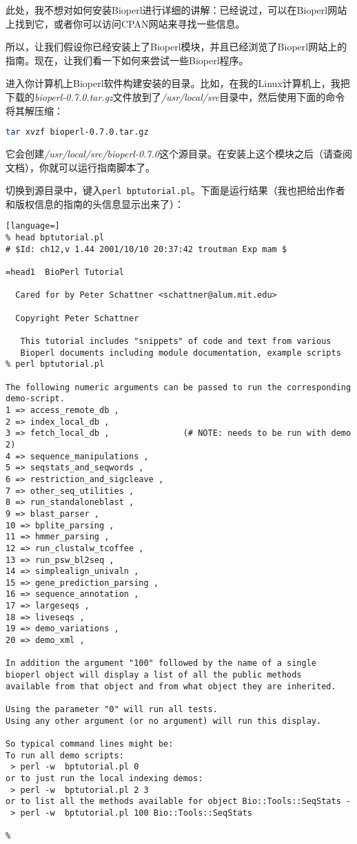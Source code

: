 此处，我不想对如何安装Bioperl进行详细的讲解：已经说过，可以在Bioperl网站上找到它，或者你可以访问CPAN网站来寻找一些信息。

所以，让我们假设你已经安装上了Bioperl模块，并且已经浏览了Bioperl网站上的指南。现在，让我们看一下如何来尝试一些Bioperl程序。

进入你计算机上Bioperl软件构建安装的目录。比如，在我的Linux计算机上，我把下载的\textit{bioperl-0.7.0.tar.gz}文件放到了\textit{/usr/local/src}目录中，然后使用下面的命令将其解压缩：

\begin{lstlisting}[language=bash]
tar xvzf bioperl-0.7.0.tar.gz
\end{lstlisting}

它会创建\textit{/usr/local/src/bioperl-0.7.0}这个源目录。在安装上这个模块之后（请查阅文档），你就可以运行指南脚本了。

切换到源目录中，键入\verb|perl bptutorial.pl|。下面是运行结果（我也把给出作者和版权信息的指南的头信息显示出来了）：

\begin{lstlisting}[language=]
% head bptutorial.pl 
# $Id: ch12,v 1.44 2001/10/10 20:37:42 troutman Exp mam $

=head1  BioPerl Tutorial

  Cared for by Peter Schattner <schattner@alum.mit.edu>

  Copyright Peter Schattner

   This tutorial includes "snippets" of code and text from various
   Bioperl documents including module documentation, example scripts
% perl bptutorial.pl 

The following numeric arguments can be passed to run the corresponding demo-script.
1 => access_remote_db ,
2 => index_local_db ,
3 => fetch_local_db ,               (# NOTE: needs to be run with demo 2)
4 => sequence_manipulations ,
5 => seqstats_and_seqwords ,
6 => restriction_and_sigcleave ,
7 => other_seq_utilities ,
8 => run_standaloneblast ,
9 => blast_parser ,
10 => bplite_parsing ,
11 => hmmer_parsing ,
12 => run_clustalw_tcoffee ,
13 => run_psw_bl2seq ,
14 => simplealign_univaln ,
15 => gene_prediction_parsing ,
16 => sequence_annotation ,
17 => largeseqs ,
18 => liveseqs ,
19 => demo_variations ,
20 => demo_xml ,

In addition the argument "100" followed by the name of a single
bioperl object will display a list of all the public methods
available from that object and from what object they are inherited.

Using the parameter "0" will run all tests.
Using any other argument (or no argument) will run this display.

So typical command lines might be:
To run all demo scripts:
 > perl -w  bptutorial.pl 0
or to just run the local indexing demos:
 > perl -w  bptutorial.pl 2 3
or to list all the methods available for object Bio::Tools::SeqStats -
 > perl -w  bptutorial.pl 100 Bio::Tools::SeqStats

%
\end{lstlisting}

